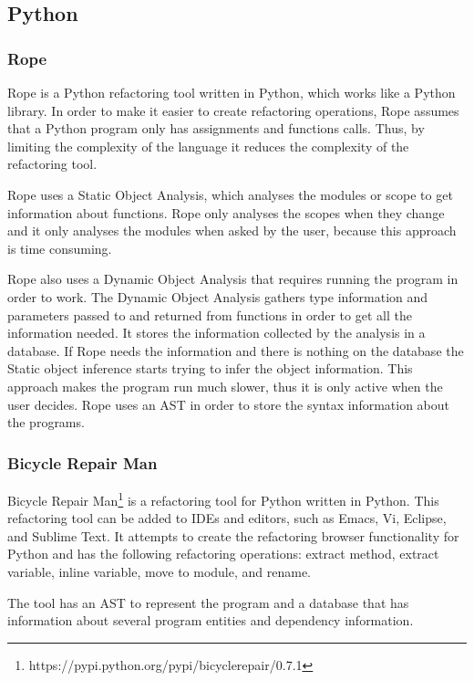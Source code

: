 \subsection{Python}

\subsubsection{Rope}
Rope\cite[p.~109]{govindaraj2015test} is a Python refactoring tool written in Python, which works like a Python library.
In order to make it easier to create refactoring operations, Rope assumes that a
Python program only has assignments and functions calls. %
Thus, by limiting the complexity of the language it reduces the complexity of the
refactoring tool.

Rope uses a Static Object Analysis, which analyses the modules or scope to get
information about functions.
Rope only analyses the scopes when they change and it only analyses the modules
when asked by the user, because this approach is time consuming.

Rope also uses a Dynamic Object Analysis that requires running
the program in order to work.
The Dynamic Object Analysis gathers type information and parameters passed to and returned from
functions in order to get all the information needed.
It stores the information collected by the analysis in a database.
If Rope needs the information and there is nothing on the database the Static
object inference starts trying to infer the object information.
This approach makes the program run much slower, thus it is only active when
the user decides. %
Rope uses an AST in order to store the syntax information about the programs.

\subsubsection{Bicycle Repair Man}
Bicycle Repair Man\footnote{https://pypi.python.org/pypi/bicyclerepair/0.7.1} is a refactoring tool for Python written in Python.
 This refactoring tool can be added to IDEs and editors, such as Emacs, Vi, Eclipse,
  and Sublime Text.
It attempts to create the refactoring browser functionality for
 Python and has the following refactoring operations:
 extract method, extract variable, inline variable, move to module, and rename.

The tool has an AST to represent the program and a database that has information
about several program entities and dependency information.

